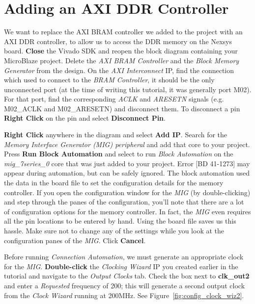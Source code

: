 \documentclass[11pt]{article}
\begin{document}
\section{Adding an AXI DDR Controller}
\label{sec:add_ddr}
We want to replace the AXI BRAM controller we added to the project with an AXI DDR controller, to allow us to access the DDR memory on the Nexsys board. \textbf{Close} the Vivado SDK and reopen the block diagram containing your MicroBlaze project. Delete the \textit{AXI BRAM Controller} and the \textit{Block Memory Generator} from the design. On the \textit{AXI Interconnect} IP, find the connection which used to connect to the \textit{BRAM Controller}, it should be the only unconnected port (at the time of writing this tutorial, it was generally port M02). For that port, find the corresponding \textit{ACLK} and \textit{ARESETN} signals (e.g. M02\_ACLK and M02\_ARESETN) and disconnect them. To disconnect a pin \textbf{Right Click} on the pin and select \textbf{Disconnect Pin}.

\textbf{Right Click} anywhere in the diagram and select \textbf{Add IP}. Search for the \textit{Memory Interface Generator (MIG) peripheral} and add that core to your project. Press \textbf{Run Block Automation} and select to run \textit{Block Automation} on the \textit{mig\_7series\_0} core that was just added to your project. Error [BD 41-1273] may appear during automation, but can be safely ignored. The block automation used the data in the board file to set the configuration details for the memory controller. If you open the configuration window for the \textit{MIG} (by double-clicking) and step through the panes of the configuration, you'll note that there are a lot of configuration options for the memory controller. In fact, the \textit{MIG} even requires all the pin locations to be entered by hand. Using the board file saves us this hassle. Make sure not to change any of the settings while you look at the configuration panes of the \textit{MIG}. Click \textbf{Cancel}.

Before running \textit{Connection Automation}, we must generate an appropriate clock for the \textit{MIG}. \textbf{Double-click} the \textit{Clocking Wizard} IP you created earlier in the tutorial and navigate to the \textit{Output Clocks} tab. Check the box next to \textbf{clk\_out2} and enter a \textit{Requested} frequency of 200; this will generate a second output clock from the \textit{Clock Wizard} running at 200MHz. See Figure~\ref{fig:config_clock_wiz2}.
\end{document}
